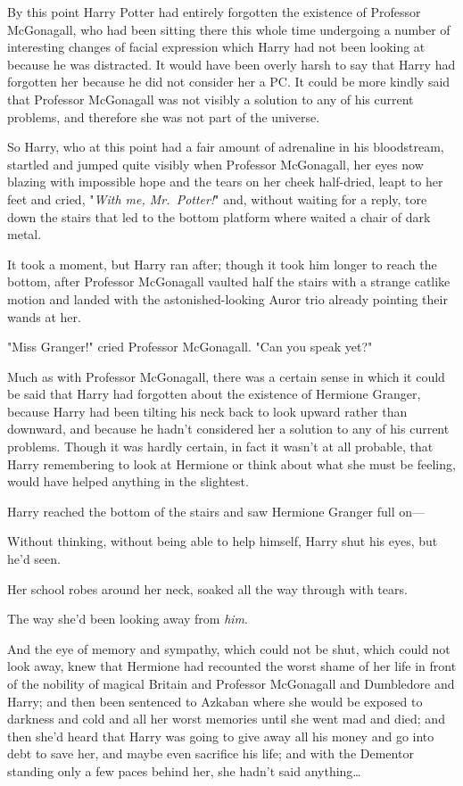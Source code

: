 By this point Harry Potter had entirely forgotten the existence of Professor
McGonagall, who had been sitting there this whole time undergoing a number of
interesting changes of facial expression which Harry had not been looking at
because he was distracted. It would have been overly harsh to say that Harry
had forgotten her because he did not consider her a PC. It could be more kindly
said that Professor McGonagall was not visibly a solution to any of his current
problems, and therefore she was not part of the universe.

So Harry, who at this point had a fair amount of adrenaline in his bloodstream,
startled and jumped quite visibly when Professor McGonagall, her eyes now
blazing with impossible hope and the tears on her cheek half-dried, leapt to
her feet and cried, "\emph{With me, Mr.~Potter!}" and, without waiting for a
reply, tore down the stairs that led to the bottom platform where waited a
chair of dark metal.

It took a moment, but Harry ran after; though it took him longer to reach the
bottom, after Professor McGonagall vaulted half the stairs with a strange
catlike motion and landed with the astonished-looking Auror trio already
pointing their wands at her.

"Miss Granger!" cried Professor McGonagall. "Can you speak yet?"

Much as with Professor McGonagall, there was a certain sense in which it could
be said that Harry had forgotten about the existence of Hermione Granger,
because Harry had been tilting his neck back to look upward rather than
downward, and because he hadn't considered her a solution to any of his current
problems. Though it was hardly certain, in fact it wasn't at all probable, that
Harry remembering to look at Hermione or think about what she must be feeling,
would have helped anything in the slightest.

Harry reached the bottom of the stairs and saw Hermione Granger full on---

Without thinking, without being able to help himself, Harry shut his eyes, but
he'd seen.

Her school robes around her neck, soaked all the way through with tears.

The way she'd been looking away from \emph{him}.

And the eye of memory and sympathy, which could not be shut, which could not
look away, knew that Hermione had recounted the worst shame of her life in
front of the nobility of magical Britain and Professor McGonagall and
Dumbledore and Harry; and then been sentenced to Azkaban where she would be
exposed to darkness and cold and all her worst memories until she went mad and
died; and then she'd heard that Harry was going to give away all his money and
go into debt to save her, and maybe even sacrifice his life; and with the Dementor
standing only a few paces behind her, she hadn't said anything{\ldots}

